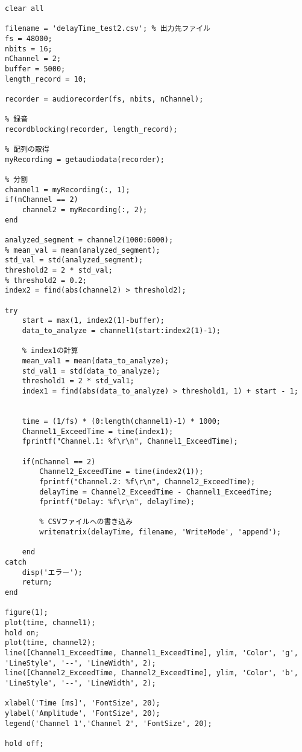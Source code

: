 \begin{lstlisting}[caption=MeasureDelayTime.m]
clear all

filename = 'delayTime_test2.csv'; % 出力先ファイル
fs = 48000; 
nbits = 16; 
nChannel = 2; 
buffer = 5000; 
length_record = 10; 

recorder = audiorecorder(fs, nbits, nChannel);

% 録音
recordblocking(recorder, length_record); 

% 配列の取得
myRecording = getaudiodata(recorder);

% 分割
channel1 = myRecording(:, 1);
if(nChannel == 2)
    channel2 = myRecording(:, 2);
end

analyzed_segment = channel2(1000:6000);
% mean_val = mean(analyzed_segment);
std_val = std(analyzed_segment);
threshold2 = 2 * std_val;
% threshold2 = 0.2;
index2 = find(abs(channel2) > threshold2); 

try
    start = max(1, index2(1)-buffer);  
    data_to_analyze = channel1(start:index2(1)-1);

    % index1の計算
    mean_val1 = mean(data_to_analyze);
    std_val1 = std(data_to_analyze);
    threshold1 = 2 * std_val1;
    index1 = find(abs(data_to_analyze) > threshold1, 1) + start - 1;

    
    time = (1/fs) * (0:length(channel1)-1) * 1000;
    Channel1_ExceedTime = time(index1);
    fprintf("Channel.1: %f\r\n", Channel1_ExceedTime);

    if(nChannel == 2)
        Channel2_ExceedTime = time(index2(1));
        fprintf("Channel.2: %f\r\n", Channel2_ExceedTime);
        delayTime = Channel2_ExceedTime - Channel1_ExceedTime;
        fprintf("Delay: %f\r\n", delayTime);

        % CSVファイルへの書き込み
        writematrix(delayTime, filename, 'WriteMode', 'append');

    end
catch
    disp('エラー');
    return;
end

figure(1); 
plot(time, channel1);
hold on;
plot(time, channel2);
line([Channel1_ExceedTime, Channel1_ExceedTime], ylim, 'Color', 'g', 'LineStyle', '--', 'LineWidth', 2);
line([Channel2_ExceedTime, Channel2_ExceedTime], ylim, 'Color', 'b', 'LineStyle', '--', 'LineWidth', 2);

xlabel('Time [ms]', 'FontSize', 20);  
ylabel('Amplitude', 'FontSize', 20);  
legend('Channel 1','Channel 2', 'FontSize', 20);

hold off;
\end{lstlisting}
    